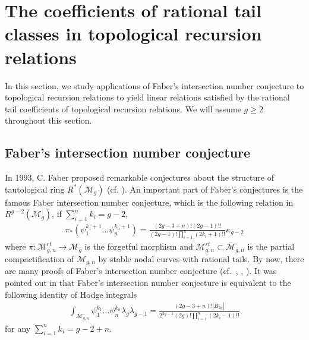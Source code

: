 \documentclass[12pt,reqno]{amsart}
\theoremstyle{plain}
\theoremstyle{definition}
\theoremstyle{remark}
\begin{document}
\section{The coefficients of rational tail classes in topological recursion relations}
\label{sec:boun-g-2}

In this section, we study applications of Faber's intersection number conjecture to topological recursion relations to yield linear relations satisfied by the rational tail coefficients of topological recursion relations.
We will assume $g \ge 2$ throughout this section.

\subsection{Faber's intersection number conjecture}

In 1993, C. Faber  proposed remarkable conjectures about the structure of
tautological ring $R^*(\mathcal{M}_{g})$ (cf. \cite{faber1999conjectural}).
An important part of Faber's conjectures is the famous Faber intersection number
conjecture, which is the following relation in $R^{g-2}(\mathcal{M}_{g})$, if $\sum_{i=1}^{n}k_i=g-2$, 
\begin{align*}
\pi_*(\psi_1^{k_1+1}\dots \psi_{n}^{k_n+1})=\frac{(2g-3+n)!(2g-1)!!}{(2g-1)!\prod_{i=1}^{n}(2k_i+1)!!} \kappa_{g-2}   
\end{align*}
where $\pi: \mathcal{M}^{rt}_{g,n}\rightarrow\mathcal{M}_{g}$ is the forgetful morphism and $\mathcal{M}^{rt}_{g,n}\subset\overline{\mathcal{M}}_{g,n}$ is the partial compactification of $\mathcal{M}_{g,n}$ by stable nodal
 curves with rational tails.
By now, there are many proofs of Faber's intersection number conjecture (cf.\ \cite{liu2009proof}, \cite{buryak2011new}, \cite{garcia2022curious}). It was pointed out in \cite{liu2009proof} that Faber's intersection number conjecture is equivalent to the following identity of Hodge integrals
\begin{align}\label{eqn:faber-int-conj-hodge}
\int_{\overline{\mathcal{M}}_{g,n}}\psi_1^{k_1}\dots \psi_{n}^{k_n}\lambda_g\lambda_{g-1}=\frac{(2g-3+n)!
|B_{2g}|}{2^{2g-1}(2g)!\prod_{i=1}^{n}(2k_i-1)!!}   
\end{align}
for any $\sum_{i=1}^{n}k_i=g-2+n$. 
\end{document}
